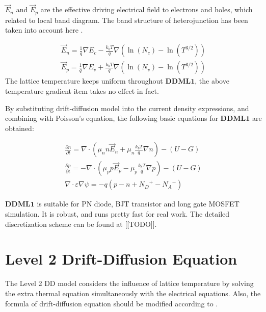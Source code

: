 $\vec{E}_n$ and $\vec{E}_p$ are the effective driving electrical field to electrons and holes, which related to local band diagram. The band structure of heterojunction has been taken into account here \cite{Lindefelt1994}.

\begin{equation}\label{eq:Equation:DDML1:DrivingField}\begin{array}{l}
\displaystyle \vec{E}_n  = \frac{1}{q}\nabla E_c - \frac{k_b T}{q}\nabla \left( \ln (N_c ) - \ln (T^{3/2} ) \right) \\
\displaystyle \vec{E}_p  = \frac{1}{q}\nabla E_v + \frac{k_b T}{q}\nabla \left( \ln (N_v ) - \ln (T^{3/2} ) \right)
\end{array}\end{equation}
The lattice temperature keeps uniform throughout $\mathbf{DDML1}$, the above temperature gradient item takes no effect in fact.

By substituting drift-diffusion model into the current density expressions, and combining with Poisson's equation, the following basic equations for $\mathbf{DDML1}$ are obtained:

\begin{equation}\begin{array}{l}
\displaystyle \frac{\partial n}{\partial t}  = \nabla \cdot \left (\mu_n n \vec{E}_n + \mu_n\frac{k_b T}{q}\nabla n \right) - (U - G) \\
\displaystyle \frac{\partial p}{\partial t}  = -\nabla \cdot \left (\mu_p p\vec{E}_p - \mu_p\frac{k_b T}{q}\nabla p \right) - (U - G)  \\
\displaystyle \nabla \cdot \varepsilon \nabla \psi  = - q(p - n + {N_D}^{+} - {N_A}^{-} )
\end{array}\end{equation}

$\mathbf{DDML1}$ is suitable for PN diode, BJT transistor and long gate MOSFET simulation. It is robust, and runs pretty fast for real work. The detailed discretization scheme can be found at [[TODO]].

\section{Level 2 Drift-Diffusion Equation} \label{sec:Equation:DDML2}
The Level 2 DD model considers the influence of lattice temperature by solving the extra thermal equation simultaneously with the electrical equations. Also, the formula of drift-diffusion equation should be modified according to \cite{Selberherr1984}.

